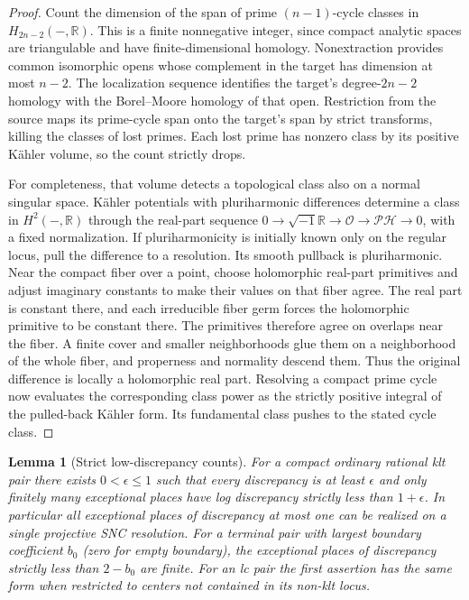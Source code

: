 \documentclass[11pt,letterpaper]{article}
\newcommand{\R}{\mathbb{R}}
\newcommand{\OO}{\mathcal{O}}
\newcommand{\ii}{\sqrt{-1}}
\newtheorem{lemma}[theorem]{Lemma}
\theoremstyle{definition}
\theoremstyle{remark}
\begin{document}
\begin{proof}
Count the dimension of the span of prime $(n-1)$-cycle classes in
$H_{2n-2}(-,\R)$.  This is a finite nonnegative integer, since compact
analytic spaces are triangulable and have finite-dimensional homology.
Nonextraction provides common isomorphic opens whose complement in
the target has dimension at most $n-2$.  The localization sequence
identifies the target's degree-$2n-2$ homology with the Borel--Moore
homology of that open.  Restriction from the source maps its prime-cycle
span onto the target's span by strict transforms, killing the classes
of lost primes.  Each lost prime has nonzero class by its positive
K\"ahler volume, so the count strictly drops.

For completeness, that volume detects a topological class also on a
normal singular space.  K\"ahler potentials with pluriharmonic
differences determine a class in $H^2(-,\R)$ through the real-part
sequence
$0\to\ii\R\to\OO\to\mathcal{PH}\to0$, with a fixed normalization.
If pluriharmonicity is initially known only on the regular locus,
pull the difference to a resolution.  Its smooth pullback is
pluriharmonic.  Near the compact fiber over a point, choose holomorphic
real-part primitives and adjust imaginary constants to make their
values on that fiber agree.  The real part is constant there, and
each irreducible fiber germ forces the holomorphic primitive to be
constant there.  The primitives therefore agree on overlaps near
the fiber.  A finite cover and smaller neighborhoods glue them on a
neighborhood of the whole fiber, and properness and normality descend
them.  Thus the original difference is locally a holomorphic real
part.  Resolving a compact prime cycle now evaluates the corresponding
class power as the strictly positive integral of the pulled-back
K\"ahler form.  Its fundamental class pushes to the stated cycle
class.
\end{proof}

\begin{lemma}[Strict low-discrepancy counts]
\label{bir:low-count}
For a compact ordinary rational klt pair there exists
$0<\epsilon\leq1$ such that every discrepancy is at least $\epsilon$
and only finitely many exceptional places have log discrepancy
strictly less than $1+\epsilon$.  In particular all exceptional places
of discrepancy at most one can be realized on a single projective
SNC resolution.  For a terminal pair with largest boundary
coefficient $b_0$ (zero for empty boundary), the exceptional places
of discrepancy strictly less than $2-b_0$ are finite.  For an lc
pair the first assertion has the same form when restricted to
centers not contained in its non-klt locus.
\end{lemma}
\end{document}
